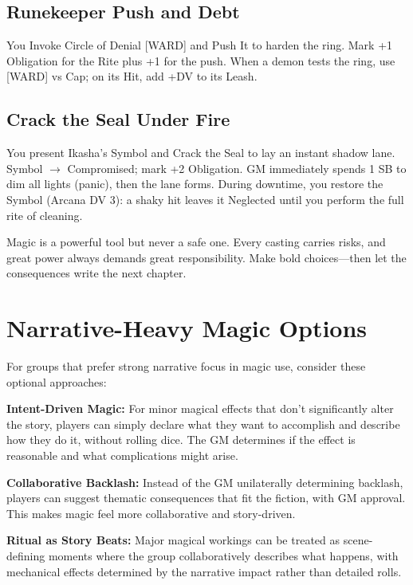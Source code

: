 \documentclass[11pt,twoside,openany]{book}
\begin{document}
\subsection*{Runekeeper Push and Debt}

You Invoke Circle of Denial [WARD] and Push It to harden the ring. Mark +1 Obligation for the Rite plus +1 for the push. When a demon tests the ring, use [WARD] vs Cap; on its Hit, add +DV to its Leash.

\subsection*{Crack the Seal Under Fire}

You present Ikasha's Symbol and Crack the Seal to lay an instant shadow lane. Symbol $\rightarrow$ Compromised; mark +2 Obligation. GM immediately spends 1 SB to dim all lights (panic), then the lane forms. During downtime, you restore the Symbol (Arcana DV 3): a shaky hit leaves it Neglected until you perform the full rite of cleaning.

\begin{tcolorbox}[colback=gray!5!white, colframe=gray!75!black, title=Closing Thought, fonttitle=\bfseries,breakable]
Magic is a powerful tool but never a safe one. Every casting carries risks, and great power always demands great responsibility. Make bold choices---then let the consequences write the next chapter.
\end{tcolorbox}

\section*{Narrative-Heavy Magic Options} 

For groups that prefer strong narrative focus in magic use, consider these optional approaches:

\textbf{Intent-Driven Magic:} For minor magical effects that don't significantly alter the story, players can simply declare what they want to accomplish and describe how they do it, without rolling dice. The GM determines if the effect is reasonable and what complications might arise.

\textbf{Collaborative Backlash:} Instead of the GM unilaterally determining backlash, players can suggest thematic consequences that fit the fiction, with GM approval. This makes magic feel more collaborative and story-driven.

\textbf{Ritual as Story Beats:} Major magical workings can be treated as scene-defining moments where the group collaboratively describes what happens, with mechanical effects determined by the narrative impact rather than detailed rolls.
\end{document}
